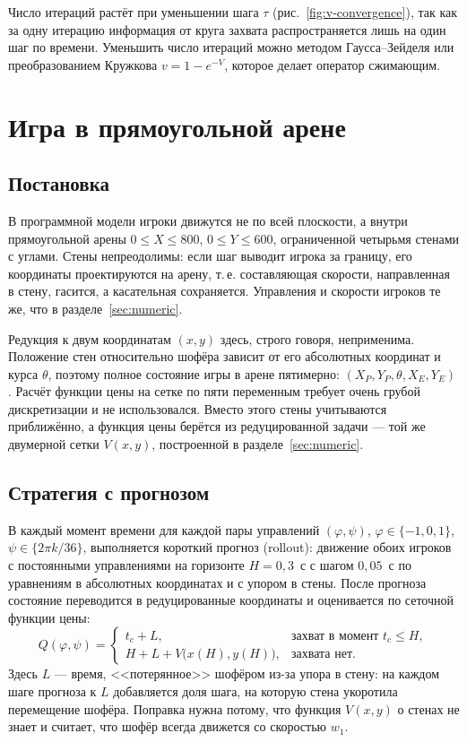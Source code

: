 \documentclass[14pt,a4paper]{extarticle}
\begin{document}
	Число итераций растёт при уменьшении шага $\tau$ (рис.~\ref{fig:v-convergence}), так как за одну итерацию информация от круга захвата распространяется лишь на один шаг по времени. Уменьшить число итераций можно методом Гаусса--Зейделя или преобразованием Кружкова $v=1-e^{-V}$, которое делает оператор сжимающим.

	\section{Игра в прямоугольной арене}\label{sec:arena}

	\subsection{Постановка}

	В программной модели игроки движутся не по всей плоскости, а внутри прямоугольной арены $0\le X\le 800$, $0\le Y\le 600$, ограниченной четырьмя стенами с углами. Стены непреодолимы: если шаг выводит игрока за границу, его координаты проектируются на арену, т.\,е. составляющая скорости, направленная в стену, гасится, а касательная сохраняется. Управления и скорости игроков те же, что в разделе~\ref{sec:numeric}.

	Редукция к двум координатам $(x,y)$ здесь, строго говоря, неприменима. Положение стен относительно шофёра зависит от его абсолютных координат и курса $\theta$, поэтому полное состояние игры в арене пятимерно: $(X_P,Y_P,\theta,X_E,Y_E)$. Расчёт функции цены на сетке по пяти переменным требует очень грубой дискретизации и не использовался. Вместо этого стены учитываются приближённо, а функция цены берётся из редуцированной задачи --- той же двумерной сетки $V(x,y)$, построенной в разделе~\ref{sec:numeric}.

	\subsection{Стратегия с прогнозом}

	В каждый момент времени для каждой пары управлений $(\varphi,\psi)$, $\varphi\in\{-1,0,1\}$, $\psi\in\{2\pi k/36\}$, выполняется короткий прогноз (rollout): движение обоих игроков с постоянными управлениями на горизонте $H=0{,}3$~с с шагом $0{,}05$~с по уравнениям в абсолютных координатах и с упором в стены. После прогноза состояние переводится в редуцированные координаты и оценивается по сеточной функции цены:
	\[
	Q(\varphi,\psi)=
	\begin{cases}
		t_c+L, & \text{захват в момент } t_c\le H,\\
		H+L+V\bigl(x(H),y(H)\bigr), & \text{захвата нет}.
	\end{cases}
	\]
	Здесь $L$ --- время, <<потерянное>> шофёром из-за упора в стену: на каждом шаге прогноза к $L$ добавляется доля шага, на которую стена укоротила перемещение шофёра. Поправка нужна потому, что функция $V(x,y)$ о стенах не знает и считает, что шофёр всегда движется со скоростью $w_1$.
\end{document}
